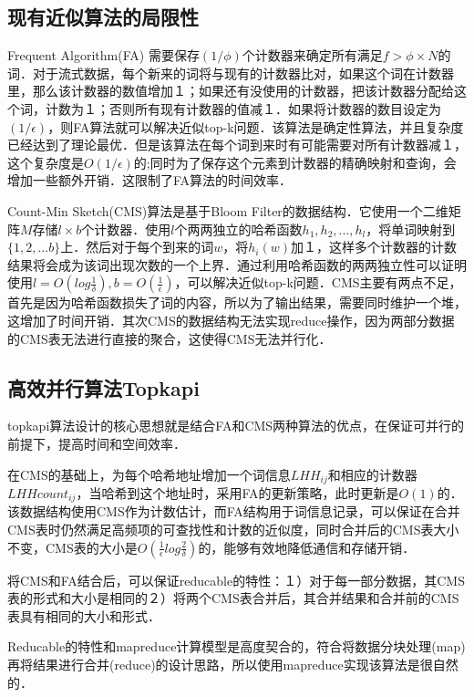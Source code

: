 \documentclass[a4paper,UTF8]{article}
\numberwithin{equation}{section}
\begin{document}
\subsection{现有近似算法的局限性}

Frequent Algorithm(FA) 需要保存$(1/\phi)$个计数器来确定所有满足$f >\phi \times N$的词．对于流式数据，每个新来的词将与现有的计数器比对，如果这个词在计数器里，那么该计数器的数值增加１；如果还有没使用的计数器，把该计数器分配给这个词，计数为１；否则所有现有计数器的值减１．如果将计数器的数目设定为$(1/\epsilon)$，则FA算法就可以解决近似top-k问题．该算法是确定性算法，并且复杂度已经达到了理论最优．但是该算法在每个词到来时有可能需要对所有计数器减１，这个复杂度是$O(1/\epsilon)$的;同时为了保存这个元素到计数器的精确映射和查询，会增加一些额外开销．这限制了FA算法的时间效率．

Count-Min Sketch(CMS)算法是基于Bloom Filter的数据结构．它使用一个二维矩阵$M$存储$l\times b$个计数器．使用$l$个两两独立的哈希函数$h_1, h_2,...,h_l$，将单词映射到$\{1, 2, ... b\}$上．然后对于每个到来的词$w$，将$h_i(w)$加１，这样多个计数器的计数结果将会成为该词出现次数的一个上界．通过利用哈希函数的两两独立性可以证明使用$l=O(log\frac{1}{\delta}), b=O(\frac{1}{\epsilon})$，可以解决近似top-k问题．CMS主要有两点不足，首先是因为哈希函数损失了词的内容，所以为了输出结果，需要同时维护一个堆，这增加了时间开销．其次CMS的数据结构无法实现reduce操作，因为两部分数据的CMS表无法进行直接的聚合，这使得CMS无法并行化．

\subsection{高效并行算法Topkapi}

topkapi算法设计的核心思想就是结合FA和CMS两种算法的优点，在保证可并行的前提下，提高时间和空间效率．

在CMS的基础上，为每个哈希地址增加一个词信息$LHH_{ij}$和相应的计数器$LHHcount_{ij}$，当哈希到这个地址时，采用FA的更新策略，此时更新是$O(1)$的．该数据结构使用CMS作为计数估计，而FA结构用于词信息记录，可以保证在合并CMS表时仍然满足高频项的可查找性和计数的近似度，同时合并后的CMS表大小不变，CMS表的大小是$O(\frac{1}{\epsilon}log\frac{2}{\delta})$的，能够有效地降低通信和存储开销．

将CMS和FA结合后，可以保证reducable的特性：１）对于每一部分数据，其CMS表的形式和大小是相同的２）将两个CMS表合并后，其合并结果和合并前的CMS表具有相同的大小和形式．

Reducable的特性和mapreduce计算模型是高度契合的，符合将数据分块处理(map)再将结果进行合并(reduce)的设计思路，所以使用mapreduce实现该算法是很自然的．
\end{document}
